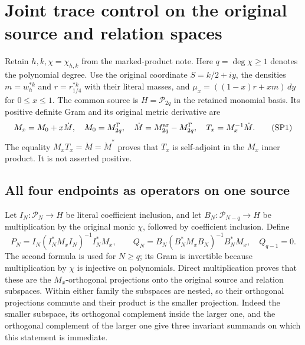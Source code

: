 \section{Joint trace control on the original source and relation spaces}
\label{sec:signed-projection-control}

Retain \(h,k,\chi=\chi_{h,k}\) from the marked-product note. Here
\(q=\deg\chi\geq1\) denotes the polynomial degree. Use the original
coordinate \(S=k/2+iy\), the densities \(m=w_h^{*k}\) and
\(r=r_{1/4}^{*k}\) with their literal masses, and
\(\mu_x=((1-x)r+xm)\,dy\) for \(0\leq x\leq1\).
The common source is \(H=\mathcal P_{2q}\) in the retained monomial basis.
Its positive definite Gram and its original metric derivative are
\[
 M_x=M_0+x\dot M,\quad M_0=M^\Gamma_{2q},\quad
 \dot M=M^{\rm ar}_{2q}-M^\Gamma_{2q},\quad
 T_x=M_x^{-1}\dot M .
 \tag{SP1}
\]
The equality \(M_xT_x=\dot M=\dot M^*\) proves that \(T_x\) is
self-adjoint in the \(M_x\) inner product. It is not asserted positive.

\subsection{All four endpoints as operators on one source}
Let \(I_N:\mathcal P_N\to H\) be literal coefficient inclusion, and
let \(B_N:\mathcal P_{N-q}\to H\) be multiplication by the original
monic \(\chi\), followed by coefficient inclusion. Define
\[
 P_N=I_N(I_N^*M_xI_N)^{-1}I_N^*M_x,\qquad
 Q_N=B_N(B_N^*M_xB_N)^{-1}B_N^*M_x,\quad Q_{q-1}=0 .
 \tag{SP2}
\]
The second formula is used for \(N\geq q\); its Gram is invertible
because multiplication by \(\chi\) is injective on polynomials.
Direct multiplication proves that these are the \(M_x\)-orthogonal
projections onto the original source and relation subspaces.
Within either family the subspaces are nested, so their orthogonal
projections commute and their product is the smaller projection.
Indeed the smaller subspace, its orthogonal complement inside the
larger one, and the orthogonal complement of the larger one give
three invariant summands on which this statement is immediate.

